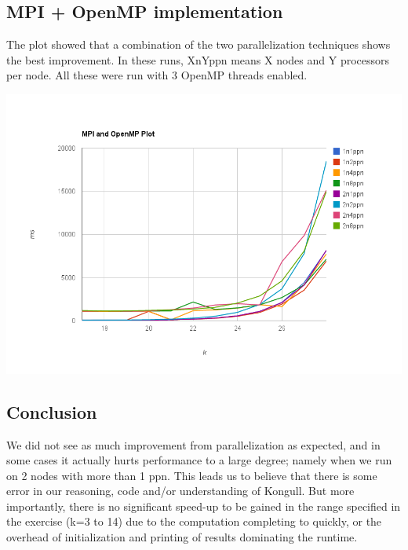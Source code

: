 \documentclass[fontsize=11pt,paper=a4,titlepage]{report}
\begin{document}
\subsection{MPI + OpenMP implementation}
The plot showed that a combination of the two parallelization techniques shows the best improvement. In these runs, XnYppn means X nodes and Y processors per node. All these were run with 3 OpenMP threads enabled.
\begin{center}
\includegraphics[scale=0.45]{chart_3.png}
\end{center}
\subsection{Conclusion}
We did not see as much improvement from parallelization as expected, and in some cases it actually hurts performance to a large degree; namely when we run on 2 nodes with more than 1 ppn. This leads us to believe that there is some error in our reasoning, code and/or understanding of Kongull.
But more importantly, there is no significant speed-up to be gained in the range specified in the exercise (k=3 to 14) due to the computation completing to quickly, or the overhead of initialization and printing of results dominating the runtime.
\end{document}
